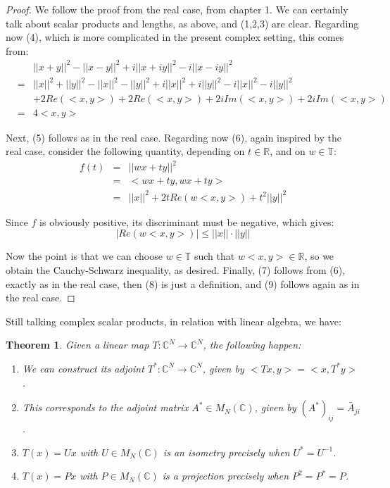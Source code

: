 \documentclass[12pt]{amsbook}
\newtheorem{theorem}{Theorem}[chapter]
\begin{document}
\begin{proof}
We follow the proof from the real case, from chapter 1. We can certainly talk about scalar products and lengths, as above, and (1,2,3) are clear. Regarding now (4), which is more complicated in the present complex setting, this comes from:
\begin{eqnarray*}
&&||x+y||^2-||x-y||^2+i||x+iy||^2-i||x-iy||^2\\
&=&||x||^2+||y||^2-||x||^2-||y||^2+i||x||^2+i||y||^2-i||x||^2-i||y||^2\\
&&+2Re(<x,y>)+2Re(<x,y>)+2iIm(<x,y>)+2iIm(<x,y>)\\
&=&4<x,y>
\end{eqnarray*}

Next, (5) follows as in the real case. Regarding now (6), again inspired by the real case, consider the following quantity, depending on $t\in\mathbb R$, and on $w\in\mathbb T$:
\begin{eqnarray*}
f(t)
&=&||wx+ty||^2\\
&=&<wx+ty,wx+ty>\\
&=&||x||^2+2tRe(w<x,y>)+t^2||y||^2
\end{eqnarray*}

Since $f$ is obviously positive, its discriminant must be negative, which gives:
$$|Re(w<x,y>)|\leq||x||\cdot||y||$$

Now the point is that we can choose $w\in\mathbb T$ such that $w<x,y>\in\mathbb R$, so we obtain the Cauchy-Schwarz inequality, as desired. Finally, (7) follows from (6), exactly as in the real case, then (8) is just a definition, and (9) follows again as in the real case.
\end{proof}
 
Still talking complex scalar products, in relation with linear algebra, we have:

\begin{theorem}
Given a linear map $T:\mathbb C^N\to\mathbb C^N$, the following happen:
\begin{enumerate}
\item We can construct its adjoint $T^*:\mathbb C^N\to\mathbb C^N$, given by $<Tx,y>=<x,T^*y>$.

\item This corresponds to the adjoint matrix $A^*\in M_N(\mathbb C)$, given by $(A^*)_{ij}=\bar{A}_{ji}$.

\item $T(x)=Ux$ with $U\in M_N(\mathbb C)$ is an isometry precisely when $U^*=U^{-1}$.

\item $T(x)=Px$ with $P\in M_N(\mathbb C)$ is a projection precisely when $P^2=P^*=P$.
\end{enumerate}
\end{theorem}
\end{document}
